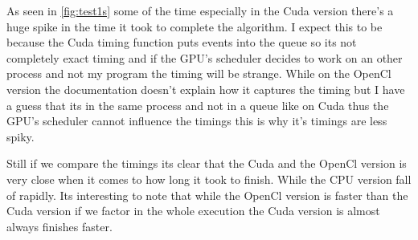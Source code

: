 As seen in \autoref{fig:test1s} some of the time especially in the Cuda version there's a huge spike in the time it took to complete the algorithm. I expect this to be because the Cuda timing function puts events into the queue so its not completely exact timing and if the \ac{GPU}'s scheduler decides to work on an other process and not my program the timing will be strange. While on the OpenCl version the documentation doesn't explain how it captures the timing but I have a guess that its in the same process and not in a queue like on Cuda thus the \ac{GPU}'s scheduler cannot influence the timings this is why it's timings are less spiky. 

Still if we compare the timings its clear that the Cuda and the OpenCl version is very close when it comes to how long it took to finish. While the \ac{CPU} version fall of rapidly. Its interesting to note that while the OpenCl version is faster than the Cuda version if we factor in the whole execution the Cuda version is almost always finishes faster.
